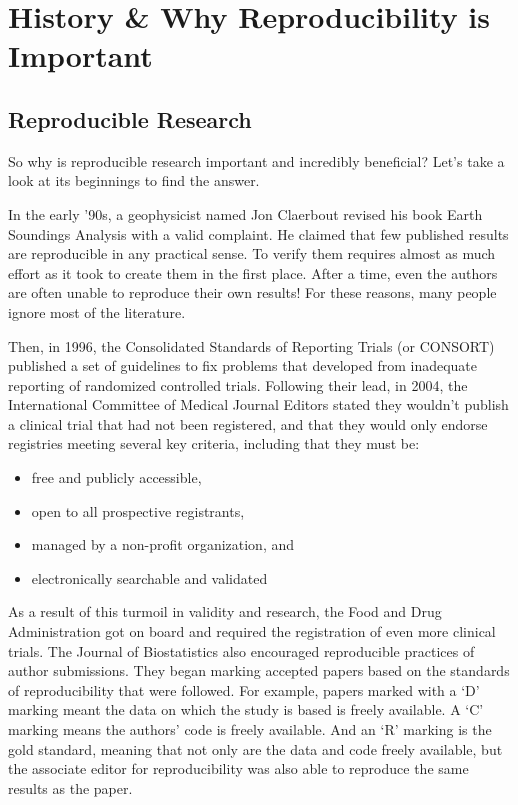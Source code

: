 \documentclass[
]{book}
\providecommand{\tightlist}{%
  \setlength{\itemsep}{0pt}\setlength{\parskip}{0pt}}
\begin{document}
\hypertarget{history}{%
\chapter{History \& Why Reproducibility is Important}\label{history}}

\hypertarget{reproducible-research}{%
\section{Reproducible Research}\label{reproducible-research}}

So why is reproducible research important and incredibly beneficial? Let's take a look at its beginnings to find the answer.

In the early '90s, a geophysicist named Jon Claerbout revised his book Earth Soundings Analysis with a valid complaint. He claimed that few published results are reproducible in any practical sense. To verify them requires almost as much effort as it took to create them in the first place. After a time, even the authors are often unable to reproduce their own results! For these reasons, many people ignore most of the literature.

Then, in 1996, the Consolidated Standards of Reporting Trials (or CONSORT) published a set of guidelines to fix problems that developed from inadequate reporting of randomized controlled trials. Following their lead, in 2004, the International Committee of Medical Journal Editors stated they wouldn't publish a clinical trial that had not been registered, and that they would only endorse registries meeting several key criteria, including that they must be:

\begin{itemize}
\tightlist
\item
  free and publicly accessible,
\item
  open to all prospective registrants,
\item
  managed by a non-profit organization, and
\item
  electronically searchable and validated
\end{itemize}

As a result of this turmoil in validity and research, the Food and Drug Administration got on board and required the registration of even more clinical trials. The Journal of Biostatistics also encouraged reproducible practices of author submissions. They began marking accepted papers based on the standards of reproducibility that were followed. For example, papers marked with a `D' marking meant the data on which the study is based is freely available. A `C' marking means the authors' code is freely available. And an `R' marking is the gold standard, meaning that not only are the data and code freely available, but the associate editor for reproducibility was also able to reproduce the same results as the paper.
\end{document}
